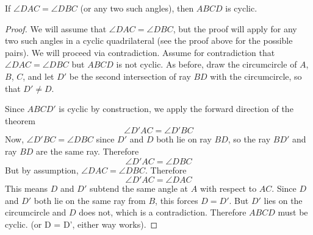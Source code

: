 \begin{theorem}
If $\angle DAC = \angle DBC$ (or any two such angles), then $ABCD$ is cyclic.
\end{theorem}
\begin{proof}
We will assume that $\angle DAC = \angle DBC$, but the proof will apply for any two such angles in a cyclic quadrilateral (see the proof above for the possible pairs). We will proceed via contradiction. Assume for contradiction that $\angle DAC = \angle DBC$ but $ABCD$ is not cyclic. As before, draw the circumcircle of $A$, $B$, $C$, and let $D'$ be the second intersection of ray $BD$ with the circumcircle, so that $D' \neq D$.
\begin{center}
\end{center}
Since $ABCD'$ is cyclic by construction, we apply the forward direction of the theorem
\[
\angle D'AC = \angle D'BC
\]
Now, $\angle D'BC = \angle DBC$ since $D'$ and $D$ both lie on ray $BD$, so the ray $BD'$ and ray $BD$ are the same ray. Therefore
\[
\angle D'AC = \angle DBC
\]
But by assumption, $\angle DAC = \angle DBC$. Therefore
\[
\angle D'AC = \angle DAC
\]
This means $D$ and $D'$ subtend the same angle at $A$ with respect to $AC$. Since $D$ and $D'$ both lie on the same ray from $B$, this forces $D = D'$. But $D'$ lies on the circumcircle and $D$ does not, which is a contradiction. Therefore $ABCD$ must be cyclic. (or D = D', either way works).
\end{proof}

